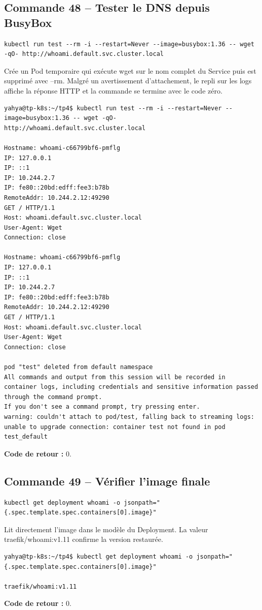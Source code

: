 \documentclass[11pt,a4paper]{article}
\begin{document}
\subsection{Commande 48 -- Tester le DNS depuis BusyBox}
\begin{lstlisting}
kubectl run test --rm -i --restart=Never --image=busybox:1.36 -- wget -qO- http://whoami.default.svc.cluster.local
\end{lstlisting}
Crée un Pod temporaire qui exécute wget sur le nom complet du Service puis est supprimé avec --rm. Malgré un avertissement d’attachement, le repli sur les logs affiche la réponse HTTP et la commande se termine avec le code zéro.
\begin{tcolorbox}[terminal,title={Ubuntu / WSL2 -- Commande 48 -- rendu reconstitué}]
\begin{Verbatim}[fontsize=\scriptsize,breaklines=true,breakanywhere=true,breaksymbolleft={},breaksymbolright={}]
yahya@tp-k8s:~/tp4$ kubectl run test --rm -i --restart=Never --image=busybox:1.36 -- wget -qO- http://whoami.default.svc.cluster.local

Hostname: whoami-c66799bf6-pmflg
IP: 127.0.0.1
IP: ::1
IP: 10.244.2.7
IP: fe80::20bd:edff:fee3:b78b
RemoteAddr: 10.244.2.12:49290
GET / HTTP/1.1
Host: whoami.default.svc.cluster.local
User-Agent: Wget
Connection: close

Hostname: whoami-c66799bf6-pmflg
IP: 127.0.0.1
IP: ::1
IP: 10.244.2.7
IP: fe80::20bd:edff:fee3:b78b
RemoteAddr: 10.244.2.12:49290
GET / HTTP/1.1
Host: whoami.default.svc.cluster.local
User-Agent: Wget
Connection: close

pod "test" deleted from default namespace
All commands and output from this session will be recorded in container logs, including credentials and sensitive information passed through the command prompt.
If you don't see a command prompt, try pressing enter.
warning: couldn't attach to pod/test, falling back to streaming logs: unable to upgrade connection: container test not found in pod test_default
\end{Verbatim}
\end{tcolorbox}
\textbf{Code de retour :} 0.

\subsection{Commande 49 -- Vérifier l’image finale}
\begin{lstlisting}
kubectl get deployment whoami -o jsonpath="{.spec.template.spec.containers[0].image}"
\end{lstlisting}
Lit directement l’image dans le modèle du Deployment. La valeur traefik/whoami:v1.11 confirme la version restaurée.
\begin{tcolorbox}[terminal,title={Ubuntu / WSL2 -- Commande 49 -- rendu reconstitué}]
\begin{Verbatim}[fontsize=\scriptsize,breaklines=true,breakanywhere=true,breaksymbolleft={},breaksymbolright={}]
yahya@tp-k8s:~/tp4$ kubectl get deployment whoami -o jsonpath="{.spec.template.spec.containers[0].image}"

traefik/whoami:v1.11
\end{Verbatim}
\end{tcolorbox}
\textbf{Code de retour :} 0.
\end{document}
